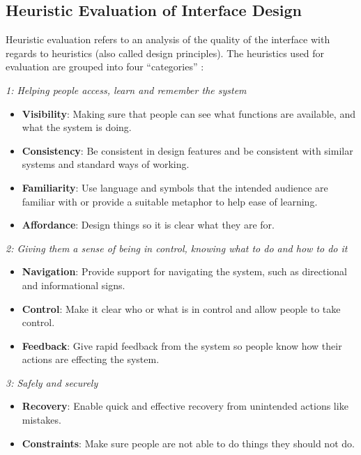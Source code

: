 \subsection{Heuristic Evaluation of Interface Design}
\label{heuristic}
Heuristic evaluation refers to an analysis of the quality of the interface with regards to heuristics (also called design principles). The heuristics used for evaluation are grouped into four ``categories'' :

\textit{1: Helping people access, learn and remember the system}

\begin{itemize}
	\item{\textbf{Visibility}}: Making sure that people can see what functions are available, and what the system is doing.
	\item{\textbf{Consistency}}: Be consistent in design features and be consistent with similar systems and standard ways of working.
	\item{\textbf{Familiarity}}: Use language and symbols that the intended audience are familiar with or provide a suitable metaphor to help ease of learning.
	\item{\textbf{Affordance}}: Design things so it is clear what they are for.
\end{itemize}

\textit{2: Giving them a sense of being in control, knowing what to do and how to do it}

\begin{itemize}
	\item{\textbf{Navigation}}: Provide support for navigating the system, such as directional and informational signs.
	\item{\textbf{Control}}: Make it clear who or what is in control and allow people to take control.
	\item{\textbf{Feedback}}: Give rapid feedback from the system so people know how their actions are effecting the system.
\end{itemize}

	\textit{3: Safely and securely}
	
\begin{itemize}
	\item{\textbf{Recovery}}: Enable quick and effective recovery from unintended actions like mistakes.
	\item{\textbf{Constraints}}: Make sure people are not able to do things they should not do.
\end{itemize}
	
